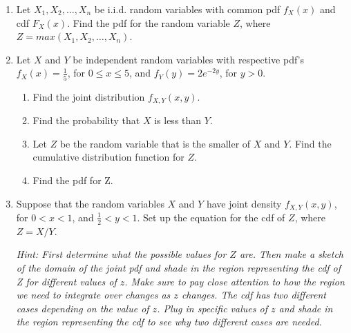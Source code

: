 \documentclass[12pt]{article}
\begin{document}
\begin{enumerate}

\item \label{pdfMax} Let $X_1, X_2, \ldots, X_n$ be i.i.d. random variables with common pdf $f_X(x)$ and cdf $F_X(x)$. Find the pdf for the random variable $Z$, where $Z = max(X_1, X_2, \ldots, X_n)$.


\item \label{Ch26_fxy_Zmin}  Let $X$ and $Y$ be independent random variables with respective pdf's $f_X(x)=\frac{1}{5}$, for $0\leq x\leq 5$, and $f_Y(y)=2e^{-2y}$, for $ y>0$. 
\begin{enumerate}
\item Find the joint distribution $f_{X,Y}(x,y)$. %
\item Find the probability that $X$ is less than $Y$.%
\item Let $Z$ be the random variable that is the smaller of $X$ and $Y$. Find the cumulative distribution function for $Z$. 
\item Find the pdf for Z. %
\end{enumerate}


\item \label{Ch25_XYratio}  Suppose that the random variables $X$ and $Y$ have joint density
$f_{X,Y}(x,y)$, for $0<x<1$, and $\frac{1}{2}<y<1$. Set up the equation for
the cdf of $Z$, where $Z=X/Y$.

\emph{Hint: First determine what the possible values for $Z$ are. Then make a sketch of the domain of the joint pdf and shade in the region representing the cdf of Z for different values of $z$. Make sure to pay close attention to how the region we need to integrate over changes as $z$ changes. The cdf has two different cases depending on the value of $z$. Plug in specific values of $z$ and shade in the region representing the cdf to see why two different cases are needed.}






\end{enumerate}
\end{document}
